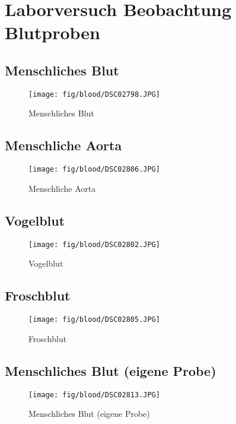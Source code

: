 \section{Laborversuch Beobachtung Blutproben}

\subsection{Menschliches Blut}
\begin{figure}[h!]
    \centering
    \texttt{[image: fig/blood/DSC02798.JPG]}
    \caption{Menschliches Blut}
    \label{fig:human_blood}
\end{figure}

\subsection{Menschliche Aorta}
\begin{figure}[h!]
    \centering
    \texttt{[image: fig/blood/DSC02806.JPG]}
    \caption{Menschliche Aorta}
    \label{fig:human_aorta}
\end{figure}
\clearpage

\subsection{Vogelblut}
\begin{figure}[h!]
    \centering
    \texttt{[image: fig/blood/DSC02802.JPG]}
    \caption{Vogelblut}
    \label{fig:bird_blood}
\end{figure}

\subsection{Froschblut}
\begin{figure}[h!]
    \centering
    \texttt{[image: fig/blood/DSC02805.JPG]}
    \caption{Froschblut}
    \label{fig:frog_blood}
\end{figure}
\clearpage

\subsection{Menschliches Blut (eigene Probe)}
\begin{figure}[h!]
    \centering
    \texttt{[image: fig/blood/DSC02813.JPG]}
    \caption{Menschliches Blut (eigene Probe)}
    \label{fig:human_blood_own}
\end{figure}
